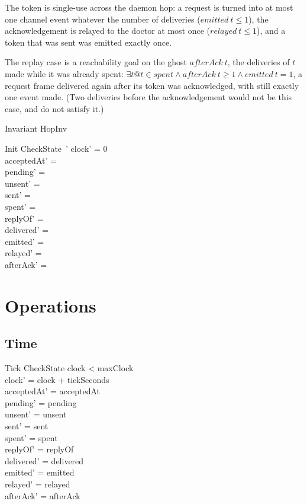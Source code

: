 \documentclass[a4paper,10pt,fleqn]{article}
\begin{document}
The token is single-use across the daemon hop: a request is turned into at most
one channel event whatever the number of deliveries ($emitted~t \leq 1$), the
acknowledgement is relayed to the doctor at most once ($relayed~t \leq 1$), and a
token that was sent was emitted exactly once.

The replay case is a reachability goal on the ghost $afterAck~t$, the deliveries
of $t$ made while it was already spent: $\exists t @ t \in spent \land
afterAck~t \geq 1 \land emitted~t = 1$, a request frame delivered again after
its token was acknowledged, with still exactly one event made.  (Two deliveries
before the acknowledgement would not be this case, and do not satisfy it.)

\begin{schema}{Invariant}
  HopInv
\end{schema}

\begin{schema}{Init}
  CheckState~'
\where
  clock' = 0 \\
  acceptedAt' = \emptyset \\
  pending' = \emptyset \\
  unsent' = \emptyset \\
  sent' = \emptyset \\
  spent' = \emptyset \\
  replyOf' = \emptyset \\
  delivered' = \emptyset \\
  emitted' = \emptyset \\
  relayed' = \emptyset \\
  afterAck' = \emptyset
\end{schema}

\section{Operations}

\subsection{Time}

\begin{schema}{Tick}
  \Delta CheckState
\where
  clock < maxClock \\
  clock' = clock + tickSeconds \\
  acceptedAt' = acceptedAt \\
  pending' = pending \\
  unsent' = unsent \\
  sent' = sent \\
  spent' = spent \\
  replyOf' = replyOf \\
  delivered' = delivered \\
  emitted' = emitted \\
  relayed' = relayed \\
  afterAck' = afterAck
\end{schema}
\end{document}
